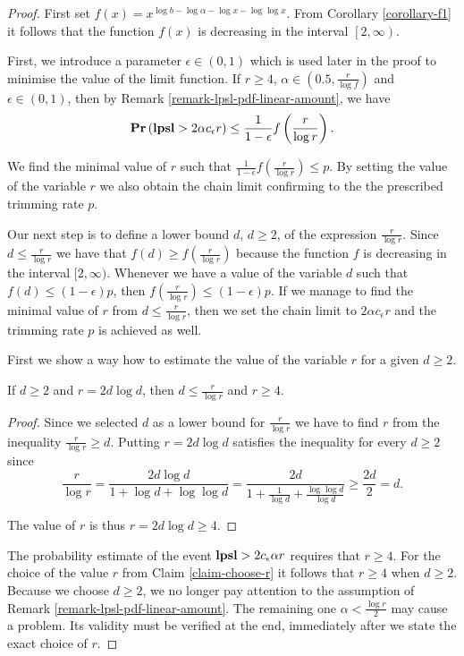 \begin{proof}
First set $f(x) = x ^ {\log b - \log \alpha - \log x - \log \log x}$. From Corollary \ref{corollary-f1} it follows that the function $f(x)$ is decreasing in the interval $\left[2, \infty \right)$.

First, we introduce a parameter $\epsilon \in (0, 1)$ which is used later in the proof to minimise the value of the limit function. If $r \geq 4$, $\alpha \in (0.5, \frac{r}{\log f})$ and $\epsilon \in (0, 1)$, then by Remark \ref{remark-lpsl-pdf-linear-amount}, we have
\[
	\mathbf{Pr}\left(\mathbf{lpsl} > 2 \alpha c_\epsilon r\right) \leq \frac{1}{1 - \epsilon} f\left(\frac{r}{\log r}\right) \text{.}
\]

We find the minimal value of $r$ such that $\frac{1}{1 - \epsilon} f\left(\frac{r}{\log r}\right) \leq p$. By setting the value of the variable $r$ we also obtain the chain limit confirming to the the prescribed trimming rate $p$. 

Our next step is to define a lower bound $d$, $d \geq 2$, of the expression $\frac{r}{\log r}$. Since $d \leq \frac{r}{\log r}$ we have that $f(d) \geq f\left(\frac{r}{\log r}\right)$ because the function $f$ is decreasing in the interval $[2, \infty)$. Whenever we have a value of the variable $d$ such that $f(d) \leq (1 - \epsilon) p$, then $f\left(\frac{r}{\log r}\right) \leq (1- \epsilon) p$. If we manage to find the minimal value of $r$ from $d \leq \frac{r}{\log r}$, then we set the chain limit to $2 \alpha c_\epsilon r$ and the trimming rate $p$ is achieved as well. 

First we show a way how to estimate the value of the variable $r$ for a given $d \geq 2$. 
\begin{claim}
\label{claim-choose-r}
If $d \geq 2$ and $r = 2d \log d$, then $d \leq \frac{r}{\log r}$ and $r \geq 4$.
\end{claim}
\begin{proof}
Since we selected $d$ as a lower bound for $\frac{r}{\log r}$ we have to find $r$ from the inequality $\frac{r}{\log r} \geq d$. Putting $r = 2 d \log d$ satisfies the inequality for every $d \geq 2$ since
\[
\frac{r}{\log r} = \frac{2 d \log d}{1 + \log d + \log \log d} = \frac{2 d}{1 + \frac{1}{\log d} + \frac{\log \log d}{\log d}} \geq \frac{2d}{2} = d \text{.}
\]

The value of $r$ is thus $r = 2d \log d \geq 4$.
\end{proof}

The probability estimate of the event $\mathbf{lpsl} > 2 c_\epsilon \alpha r$ requires that $r \geq 4$. For the choice of the value $r$ from Claim \ref{claim-choose-r} it follows that $r \geq 4$ when $d \geq 2$. Because we choose $d \geq 2$, we no longer pay attention to the assumption of Remark \ref{remark-lpsl-pdf-linear-amount}. The remaining one $\alpha < \frac{\log r}{2}$ may cause a problem. Its validity must be verified at the end, immediately after we state the exact choice of $r$.


\end{proof}

